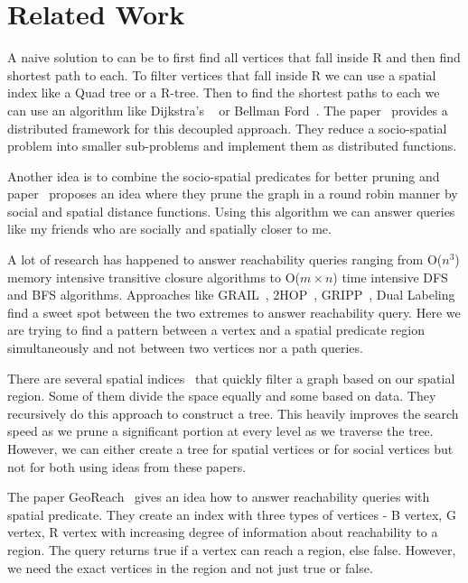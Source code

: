 \section{Related Work} \label{sec:relwork}
A naive solution to {\rrp} can be to first find all vertices that fall inside R and then find shortest path to each. To filter vertices that fall inside R we can use a spatial index like a Quad tree or a R-tree. Then to find the shortest paths to each we can use an algorithm like Dijkstra's ~\cite{S1990} or Bellman Ford~\cite{R1956}. The paper~\cite{NSD2013} provides a distributed framework for this decoupled approach. They reduce a socio-spatial problem into smaller sub-problems and implement them as distributed functions.

Another idea is to combine the socio-spatial predicates for better pruning and paper~\cite{KJY+2015} proposes an idea where they prune the graph in a round robin manner by social and spatial distance functions. Using this algorithm we can answer queries like my friends who are socially and spatially closer to me.

{A lot of research has happened to answer reachability queries ranging from O($n^3$}{) memory intensive transitive closure algorithms to O($m \times n$) time intensive DFS and BFS algorithms. Approaches like GRAIL~\cite{YCZ+2010}, 2HOP~\cite{CHK+2003}, GRIPP~\cite{SU2007}, Dual Labeling~\cite{HHJ+2006} find a sweet spot between the two extremes to answer reachability query. Here we are trying to find a pattern between a vertex and a spatial predicate region simultaneously and not between two vertices nor a path queries. }

There are several spatial indices~\cite{PMA2001,H2006,SS2003} that quickly filter a graph based on our spatial region. Some of them divide the space equally and some based on data. They recursively do this approach to construct a tree. This heavily improves the search speed as we prune a significant portion at every level as we traverse the tree. However, we can either create a tree for spatial vertices or for social vertices but not for both using ideas from these papers.

The paper GeoReach~\cite{YM2016} gives an idea how to answer reachability queries with spatial predicate. They create an index with three types of vertices - B vertex, G vertex, R vertex with increasing degree of information about reachability to a region. The query returns true if a vertex can reach a region, else false. However, we need the exact vertices in the region and not just true or false.
